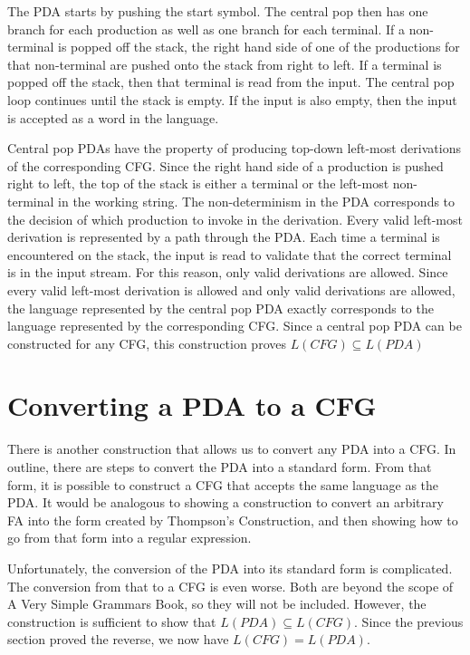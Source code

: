 \documentclass[letterpaper,12pt,openany,reqno]{book}%
\begin{document}
The PDA starts by pushing the start symbol. The central pop then has one branch for each production as well as one branch for each terminal. If a non-terminal is popped off the stack, the right hand side of one of the productions for that non-terminal are pushed onto the stack from right to left. If a terminal is popped off the stack, then that terminal is read from the input. The central pop loop continues until the stack is empty. If the input is also empty, then the input is accepted as a word in the language.

Central pop PDAs have the property of producing top-down left-most derivations of the corresponding CFG. Since the right hand side of a production is pushed right to left, the top of the stack is either a terminal or the left-most non-terminal in the working string. The non-determinism in the PDA corresponds to the decision of which production to invoke in the derivation. Every valid left-most derivation is represented by a path through the PDA. Each time a terminal is encountered on the stack, the input is read to validate that the correct terminal is in the input stream. For this reason, only valid derivations are allowed. Since every valid left-most derivation is allowed and only valid derivations are allowed, the language represented by the central pop PDA exactly corresponds to the language represented by the corresponding CFG. Since a central pop PDA can be constructed for any CFG, this construction proves $L(CFG) \subseteq L(PDA)$

\section{Converting a PDA to a CFG}
There is another construction that allows us to convert any PDA into a CFG. In outline, there are steps to convert the PDA into a standard form. From that form, it is possible to construct a CFG that accepts the same language as the PDA. It would be analogous to showing a construction to convert an arbitrary FA into the form created by Thompson's Construction, and then showing how to go from that form into a regular expression.

Unfortunately, the conversion of the PDA into its standard form is complicated. The conversion from that to a CFG is even worse. Both are beyond the scope of A Very Simple Grammars Book, so they will not be included. However, the construction is sufficient to show that $L(PDA) \subseteq L(CFG)$. Since the previous section proved the reverse, we now have $L(CFG) = L(PDA)$.
\end{document}
